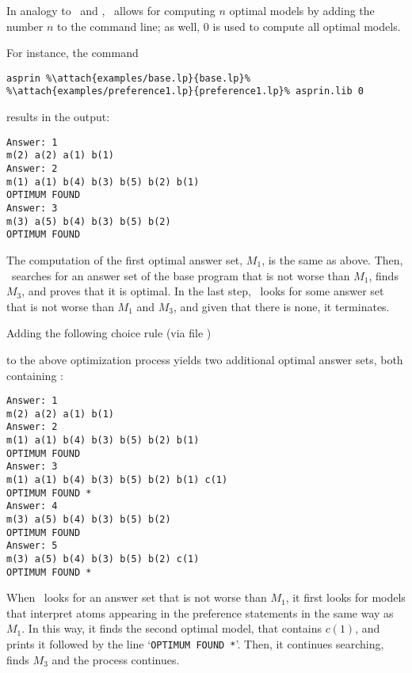 In analogy to \clasp\ and \clingo, 
\asprin\ allows for computing $n$ optimal models by adding the number $n$ to the command line;
as well, $0$ is used to compute all optimal models. 

For instance, the command
%
\begin{lstlisting}[numbers=none,escapechar=\%]
asprin %\attach{examples/base.lp}{base.lp}% %\attach{examples/preference1.lp}{preference1.lp}% asprin.lib 0
\end{lstlisting}
%
results in the output:
%
\begin{lstlisting}[numbers=none]
Answer: 1
m(2) a(2) a(1) b(1)
Answer: 2
m(1) a(1) b(4) b(3) b(5) b(2) b(1)
OPTIMUM FOUND
Answer: 3
m(3) a(5) b(4) b(3) b(5) b(2)
OPTIMUM FOUND
\end{lstlisting}
%
The computation of the first optimal answer set, $M_1$, is the same as above.
Then, \asprin\ searches for an answer set of the base program that is not worse than $M_1$, 
finds $M_3$, and proves that it is optimal. 
In the last step, \asprin\ looks for some answer set that is not worse than $M_1$ and $M_3$,  
and given that there is none, it terminates. 

Adding the following choice rule 
(via file )
%

%
to the above optimization process
yields two additional optimal answer sets, both containing : 
%
%
\begin{lstlisting}[numbers=none]
Answer: 1
m(2) a(2) a(1) b(1)
Answer: 2
m(1) a(1) b(4) b(3) b(5) b(2) b(1)
OPTIMUM FOUND
Answer: 3
m(1) a(1) b(4) b(3) b(5) b(2) b(1) c(1)
OPTIMUM FOUND *
Answer: 4
m(3) a(5) b(4) b(3) b(5) b(2)
OPTIMUM FOUND
Answer: 5
m(3) a(5) b(4) b(3) b(5) b(2) c(1)
OPTIMUM FOUND *
\end{lstlisting}
%
When \asprin\ looks for an answer set that is not worse than $M_1$,  
it first looks for models that interpret atoms appearing in the preference statements
in the same way as $M_1$. 
In this way,
it finds the second optimal model, that contains $c(1)$, 
and prints it followed by the line `\lstinline{OPTIMUM FOUND *}'.  
Then, it continues searching, finds $M_3$ and the process continues. 

